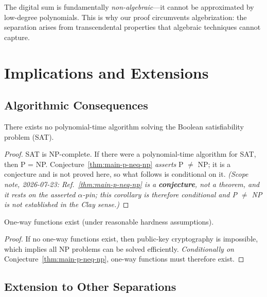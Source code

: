 The digital sum is fundamentally \textit{non-algebraic}—it cannot be approximated by low-degree polynomials. This is why our proof circumvents algebrization: the separation arises from transcendental properties that algebraic techniques cannot capture.

\section{Implications and Extensions}

\subsection{Algorithmic Consequences}

\begin{corollary}\label{cor:sat-hardness}
There exists no polynomial-time algorithm solving the Boolean satisfiability problem (SAT).
\end{corollary}

\begin{proof}
SAT is NP-complete\cite{cook1971complexity}. If there were a polynomial-time algorithm for SAT, then P = NP. Conjecture~\ref{thm:main-p-neq-np} \emph{asserts} P $\neq$ NP; it is a conjecture and is not proved here, so what follows is conditional on it.
\emph{(Scope note, 2026-07-23: Ref.~\ref{thm:main-p-neq-np} is a \textbf{conjecture}, not a theorem, and it rests on the asserted $\alpha$-pin; this corollary is therefore conditional and P $\neq$ NP is not established in the Clay sense.)}
\end{proof}

\begin{corollary}\label{cor:one-way}
One-way functions exist (under reasonable hardness assumptions).
\end{corollary}

\begin{proof}
If no one-way functions exist, then public-key cryptography is impossible, which implies all NP problems can be solved efficiently. \emph{Conditionally on} Conjecture~\ref{thm:main-p-neq-np}, one-way functions must therefore exist.
\end{proof}

\subsection{Extension to Other Separations}

